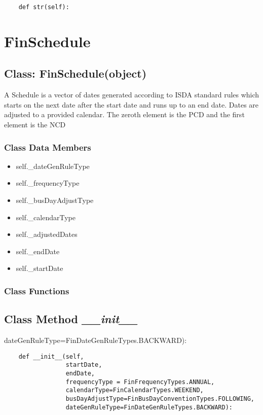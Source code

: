 \documentclass[twoside,11pt]{book}
\begin{document}
\begin{lstlisting}
    def str(self):
\end{lstlisting}

\newpage
\section{FinSchedule}

\subsection{Class: FinSchedule(object)}
A Schedule is a vector of dates generated according to ISDA standard rules which starts on the next date after the start date and runs up to an end date. Dates are adjusted to a provided calendar. The zeroth element is the PCD and the first element is the NCD 

\subsubsection{Class Data Members}
\begin{itemize}
\item{self.\_dateGenRuleType}
\item{self.\_frequencyType}
\item{self.\_busDayAdjustType}
\item{self.\_calendarType}
\item{self.\_adjustedDates}
\item{self.\_endDate}
\item{self.\_startDate}
\end{itemize}

\subsubsection{Class Functions}

\subsection{Class Method {\it \_\_init\_\_}}
dateGenRuleType=FinDateGenRuleTypes.BACKWARD):

\begin{lstlisting}
    def __init__(self,
                 startDate,
                 endDate,
                 frequencyType = FinFrequencyTypes.ANNUAL,
                 calendarType=FinCalendarTypes.WEEKEND,
                 busDayAdjustType=FinBusDayConventionTypes.FOLLOWING,
                 dateGenRuleType=FinDateGenRuleTypes.BACKWARD):
\end{lstlisting}
\end{document}
